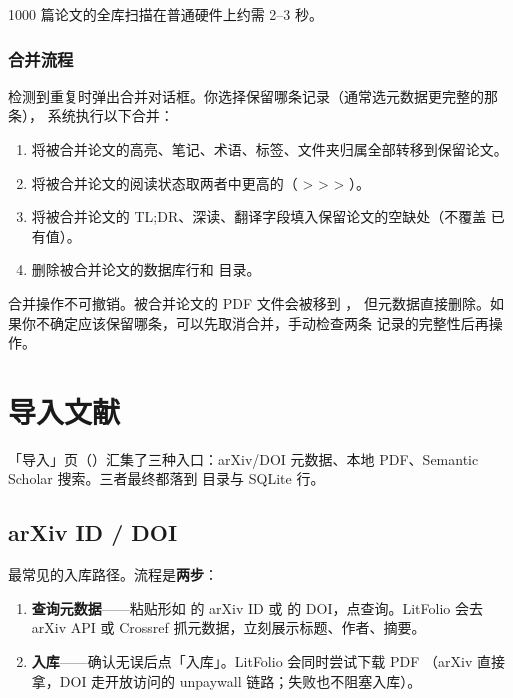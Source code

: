 1000 篇论文的全库扫描在普通硬件上约需 2--3 秒。

\subsection{合并流程}

检测到重复时弹出合并对话框。你选择保留哪条记录（通常选元数据更完整的那条），
系统执行以下合并：

\begin{enumerate}
  \item 将被合并论文的高亮、笔记、术语、标签、文件夹归属全部转移到保留论文。
  \item 将被合并论文的阅读状态取两者中更高的（ >  >
     > ）。
  \item 将被合并论文的 TL;DR、深读、翻译字段填入保留论文的空缺处（不覆盖
    已有值）。
  \item 删除被合并论文的数据库行和  目录。
\end{enumerate}

\begin{warnbox}
合并操作不可撤销。被合并论文的 PDF 文件会被移到 ，
但元数据直接删除。如果你不确定应该保留哪条，可以先取消合并，手动检查两条
记录的完整性后再操作。
\end{warnbox}

\chapter{导入文献}
\label{ch:import}

「导入」页（）汇集了三种入口：arXiv/DOI 元数据、本地 PDF、Semantic
Scholar 搜索。三者最终都落到  目录与 SQLite 行。

\section{arXiv ID / DOI}

最常见的入库路径。流程是\textbf{两步}：


\begin{enumerate}
  \item \textbf{查询元数据}——粘贴形如  的 arXiv ID 或
     的 DOI，点查询。LitFolio 会去 arXiv API
    或 Crossref 抓元数据，立刻展示标题、作者、摘要。
  \item \textbf{入库}——确认无误后点「入库」。LitFolio 会同时尝试下载 PDF
    （arXiv 直接拿，DOI 走开放访问的 unpaywall 链路；失败也不阻塞入库）。
\end{enumerate}

